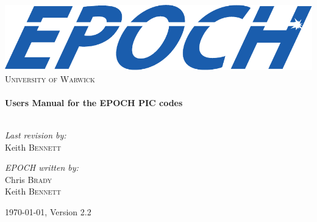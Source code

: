 \begin{titlepage}

\begin{center}

\includegraphics[width=14cm]{./images/EPOCHLogo}\\[1cm]

\textsc{\LARGE{University of Warwick}}\\[1.5cm]

\HRule\\[0.2cm]
{\huge\bfseries{Users Manual for the EPOCH PIC codes}}\\[0.4cm]
\HRule\\[1.5cm]

\begin{minipage}{0.4\textwidth}
\begin{flushleft}\large%
\emph{Last revision by:}\\
Keith \textsc{Bennett}
\end{flushleft}
\end{minipage}
\begin{minipage}{0.4\textwidth}
\begin{flushright}\large%
\emph{EPOCH written by:} \\
Chris \textsc{Brady}\\
Keith \textsc{Bennett}\\
\end{flushright}
\end{minipage}

\vfill%
{\large\today, {\EPOCH} Version 2.2}

\end{center}

\end{titlepage}
